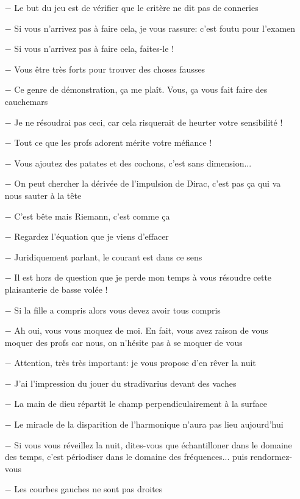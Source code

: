 \begin{itemize}
	\item[$-$] Le but du jeu est de vérifier que le critère ne dit pas de conneries
	\item[$-$] Si vous n'arrivez pas à faire cela, je vous rassure: c'est foutu pour l'examen
	\item[$-$] Si vous n'arrivez pas à faire cela, faites-le !
	\item[$-$] Vous être très forts pour trouver des choses fausses
	\item[$-$] Ce genre de démonstration, ça me plaît. Vous, ça vous fait faire des cauchemars
	\item[$-$] Je ne résoudrai pas ceci, car cela risquerait de heurter votre sensibilité !
	\item[$-$] Tout ce que les profs adorent mérite votre méfiance !
	\item[$-$] Vous ajoutez des patates et des cochons, c'est sans dimension...
	\item[$-$] On peut chercher la dérivée de l'impulsion de Dirac, c'est pas ça qui va nous sauter à la tête
	\item[$-$] C'est bête mais Riemann, c'est comme ça
	\item[$-$] Regardez l'équation que je viens d'effacer
	\item[$-$] Juridiquement parlant, le courant est dans ce sens
	\item[$-$] Il est hors de question que je perde mon temps à vous résoudre cette plaisanterie de basse volée !
	\item[$-$] Si la fille a compris alors vous devez avoir tous compris
	\item[$-$] Ah oui, vous vous moquez de moi. En fait, vous avez raison de vous moquer des profs car nous, on n'hésite pas à se moquer de vous
	\item[$-$] Attention, très très important: je vous propose d'en rêver la nuit
	\item[$-$] J'ai l'impression du jouer du stradivarius devant des vaches
	\item[$-$] La main de dieu répartit le champ perpendiculairement à la surface
	\item[$-$] Le miracle de la disparition de l'harmonique n'aura pas lieu aujourd'hui
	\item[$-$] Si vous vous réveillez la nuit, dites-vous que échantilloner dans le domaine des temps, c'est périodiser dans le domaine des fréquences... puis rendormez-vous
	\item[$-$] Les courbes gauches ne sont pas droites

\end{itemize}
